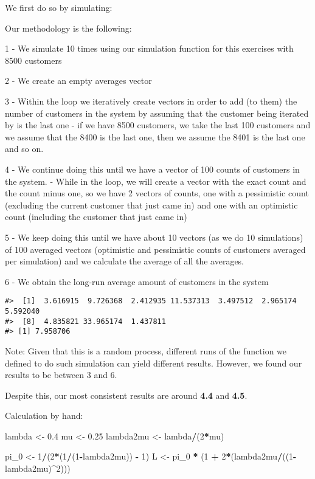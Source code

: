 \documentclass[]{article}
\newenvironment{Shaded}{\begin{snugshade}}{\end{snugshade}}
\newcommand{\DecValTok}[1]{\textcolor[rgb]{0.00,0.00,0.81}{#1}}
\newcommand{\FloatTok}[1]{\textcolor[rgb]{0.00,0.00,0.81}{#1}}
\newcommand{\NormalTok}[1]{#1}
\newcommand{\OperatorTok}[1]{\textcolor[rgb]{0.81,0.36,0.00}{\textbf{#1}}}
\newcommand{\StringTok}[1]{\textcolor[rgb]{0.31,0.60,0.02}{#1}}
\begin{document}
We first do so by simulating:

Our methodology is the following:

1 - We simulate 10 times using our simulation function for this
exercises with 8500 customers

2 - We create an empty averages vector

3 - Within the loop we iteratively create vectors in order to add (to
them) the number of customers in the system by assuming that the
customer being iterated by is the last one - if we have 8500 customers,
we take the last 100 customers and we assume that the 8400 is the last
one, then we assume the 8401 is the last one and so on.

4 - We continue doing this until we have a vector of 100 counts of
customers in the system. - While in the loop, we will create a vector
with the exact count and the count minus one, so we have 2 vectors of
counts, one with a pessimistic count (excluding the current customer
that just came in) and one with an optimistic count (including the
customer that just came in)

5 - We keep doing this until we have about 10 vectors (as we do 10
simulations) of 100 averaged vectors (optimistic and pessimistic counts
of customers averaged per simulation) and we calculate the average of
all the averages.

6 - We obtain the long-run average amount of customers in the system

\begin{verbatim}
#>  [1]  3.616915  9.726368  2.412935 11.537313  3.497512  2.965174  5.592040
#>  [8]  4.835821 33.965174  1.437811
#> [1] 7.958706
\end{verbatim}

Note: Given that this is a random process, different runs of the
function we defined to do such simulation can yield different results.
However, we found our results to be between 3 and 6.

Despite this, our most consistent results are around \textbf{4.4} and
\textbf{4.5}.

Calculation by hand:

\begin{Shaded}
\begin{Highlighting}[]
\NormalTok{lambda <-}\StringTok{ }\FloatTok{0.4}
\NormalTok{mu <-}\StringTok{ }\FloatTok{0.25}
\NormalTok{lambda2mu <-}\StringTok{ }\NormalTok{lambda}\OperatorTok{/}\NormalTok{(}\DecValTok{2}\OperatorTok{*}\NormalTok{mu)}

\NormalTok{pi_}\DecValTok{0}\NormalTok{ <-}\StringTok{ }\DecValTok{1}\OperatorTok{/}\NormalTok{(}\DecValTok{2}\OperatorTok{*}\NormalTok{(}\DecValTok{1}\OperatorTok{/}\NormalTok{(}\DecValTok{1}\OperatorTok{-}\NormalTok{lambda2mu)) }\OperatorTok{-}\StringTok{ }\DecValTok{1}\NormalTok{)}
\NormalTok{L <-}\StringTok{ }\NormalTok{pi_}\DecValTok{0} \OperatorTok{*}\StringTok{ }\NormalTok{(}\DecValTok{1} \OperatorTok{+}\StringTok{ }\DecValTok{2}\OperatorTok{*}\NormalTok{(lambda2mu}\OperatorTok{/}\NormalTok{((}\DecValTok{1}\OperatorTok{-}\NormalTok{lambda2mu)}\OperatorTok{^}\DecValTok{2}\NormalTok{)))}
\end{Highlighting}
\end{Shaded}
\end{document}
